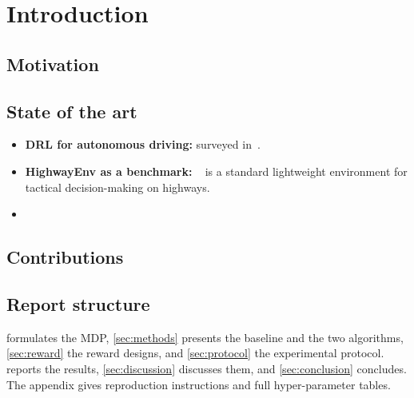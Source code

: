 \section{Introduction}\label{sec:introduction}

\subsection{Motivation}

\subsection{State of the art}\label{sec:sota-intro}
\begin{itemize}
  \item \textbf{DRL for autonomous driving:} surveyed in~\cite{kiran2022drl}. 
  \item \textbf{HighwayEnv as a benchmark:} ~\cite{highway-env} is a standard lightweight
        environment for tactical decision-making on highways.
  \item {}
\end{itemize}

\subsection{Contributions}

\subsection{Report structure}
 formulates the MDP, \cref{sec:methods} presents the baseline and the two algorithms,
\cref{sec:reward} the reward designs, and \cref{sec:protocol} the experimental protocol.
 reports the results, \cref{sec:discussion} discusses them, and
\cref{sec:conclusion} concludes. The appendix gives reproduction instructions and full hyper-parameter tables.

